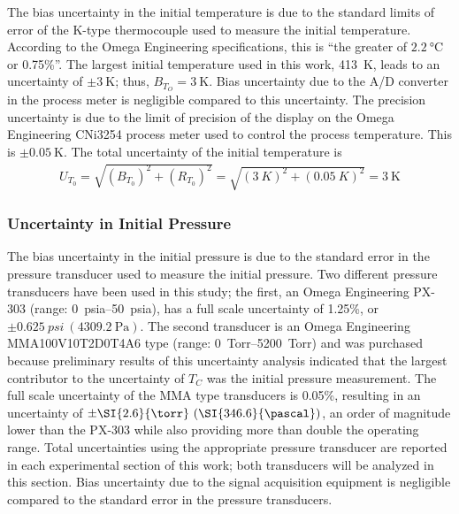 \documentclass[../main.tex]{subfiles}
\begin{document}
The bias uncertainty in the initial temperature is due to the standard
limits of error of the K-type thermocouple used to measure the
initial temperature. According to the Omega Engineering
specifications, this is ``the greater
of $\SI{2.2}{\degreeCelsius}$ or 0.75\%''. The largest initial temperature
used in this work, \SI{413}{\kelvin}, leads to an uncertainty of
$\pm \SI{3}{\kelvin}$; thus, $B_{T_O}=\SI{3}{\kelvin}$. Bias uncertainty
due to the A/D converter in the process meter is negligible compared
to this uncertainty.
The precision uncertainty is due to the limit of precision of
the display on the Omega Engineering CNi3254 process meter used
to control the process temperature. This is $\pm\SI{0.05}{\kelvin}$.
The total uncertainty of the initial temperature is
%
\begin{align}
U_{T_0} = \sqrt{\left(B_{T_0}\right)^2 + \left(R_{T_0}\right)^2} = \sqrt{\left(\SI{3}{K}\right)^2 + \left(\SI{0.05}{K}\right)^2} = \SI{3}{\kelvin}
\end{align}

\subsubsection{Uncertainty in Initial Pressure}
\label{sec:unc-p0}

The bias uncertainty in the initial pressure is due to the
standard error in the pressure transducer used to measure
the initial pressure. Two different pressure transducers have
been used in this study; the first, an Omega Engineering PX-303
(range: \SIrange{0}{50}{psia}), has a full scale uncertainty of 1.25\%, or
$\pm \SI{0.625}{psi} \ (\SI{4309.2}{\pascal})$. The second transducer is an
Omega Engineering MMA100V10T2D0T4A6 type (range: \SIrange{0}{5200}{Torr}) and was
purchased because preliminary results of this uncertainty analysis
indicated that the largest contributor to the uncertainty of $T_C$ was
the initial pressure measurement. The full scale uncertainty of the MMA
type transducers is 0.05\%, resulting in an uncertainty of
$\pm \SI{2.6}{\torr} \ (\SI{346.6}{\pascal})$, an order of magnitude lower than
the PX-303 while also providing more than double the operating range. Total
uncertainties using the appropriate pressure transducer are reported in
each experimental section of this work; both transducers will be analyzed
in this section. Bias uncertainty due to the signal acquisition equipment
is negligible compared to the standard error in the pressure transducers.
\end{document}
